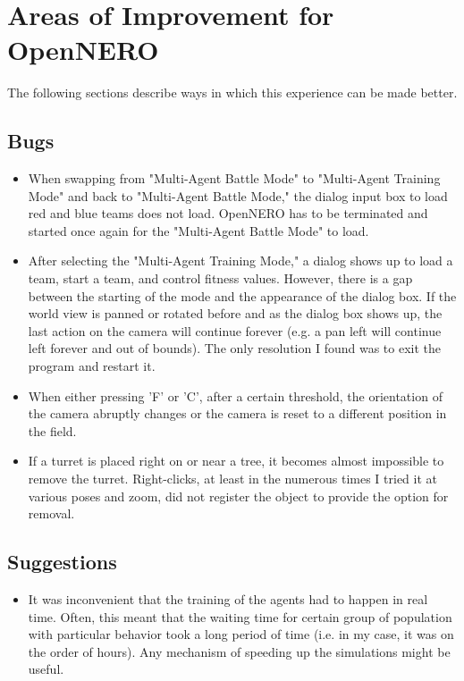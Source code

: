 \documentclass{article} %
\begin{document}
\section{Areas of Improvement for OpenNERO}
The following sections describe ways in which this experience can be made better.
\subsection{Bugs}
\begin{itemize}
\item When swapping from "Multi-Agent Battle Mode" to "Multi-Agent Training Mode" and back to "Multi-Agent Battle Mode," the dialog input box to load red and blue teams does not load. OpenNERO has to be terminated and started once again for the "Multi-Agent Battle Mode" to load.
\item After selecting the "Multi-Agent Training Mode," a dialog shows up to load a team, start a team, and control fitness values. However, there is a gap between the starting of the mode and the appearance of the dialog box. If the world view is panned or rotated before and as the dialog box shows up, the last action on the camera will continue forever (e.g. a pan left will continue left forever and out of bounds). The only resolution I found was to exit the program and restart it. 
\item When either pressing 'F' or 'C', after a certain threshold, the orientation of the camera abruptly changes or the camera is reset to a different position in the field.
\item If a turret is placed right on or near a tree, it becomes almost impossible to remove the turret. Right-clicks, at least in the numerous times I tried it at various poses and zoom, did not register the object to provide the option for removal.
\end{itemize}
\subsection{Suggestions}
\begin{itemize}
\item It was inconvenient that the training of the agents had to happen in real time. Often, this meant that the waiting time for certain group of population with particular behavior took a long period of time (i.e. in my case, it was on the order of hours). Any mechanism of speeding up the simulations might be useful. 
\end{itemize}
\end{document}
